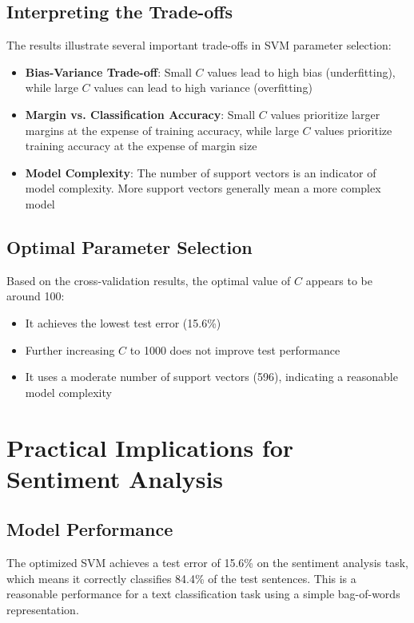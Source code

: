 \documentclass{article}
\begin{document}
\subsection{Interpreting the Trade-offs}
The results illustrate several important trade-offs in SVM parameter selection:

\begin{itemize}
    \item \textbf{Bias-Variance Trade-off}: Small $C$ values lead to high bias (underfitting), while large $C$ values can lead to high variance (overfitting)
    
    \item \textbf{Margin vs. Classification Accuracy}: Small $C$ values prioritize larger margins at the expense of training accuracy, while large $C$ values prioritize training accuracy at the expense of margin size
    
    \item \textbf{Model Complexity}: The number of support vectors is an indicator of model complexity. More support vectors generally mean a more complex model
\end{itemize}

\subsection{Optimal Parameter Selection}
Based on the cross-validation results, the optimal value of $C$ appears to be around 100:

\begin{itemize}
    \item It achieves the lowest test error (15.6\%)
    \item Further increasing $C$ to 1000 does not improve test performance
    \item It uses a moderate number of support vectors (596), indicating a reasonable model complexity
\end{itemize}

\section{Practical Implications for Sentiment Analysis}

\subsection{Model Performance}
The optimized SVM achieves a test error of 15.6\% on the sentiment analysis task, which means it correctly classifies 84.4\% of the test sentences. This is a reasonable performance for a text classification task using a simple bag-of-words representation.
\end{document}
